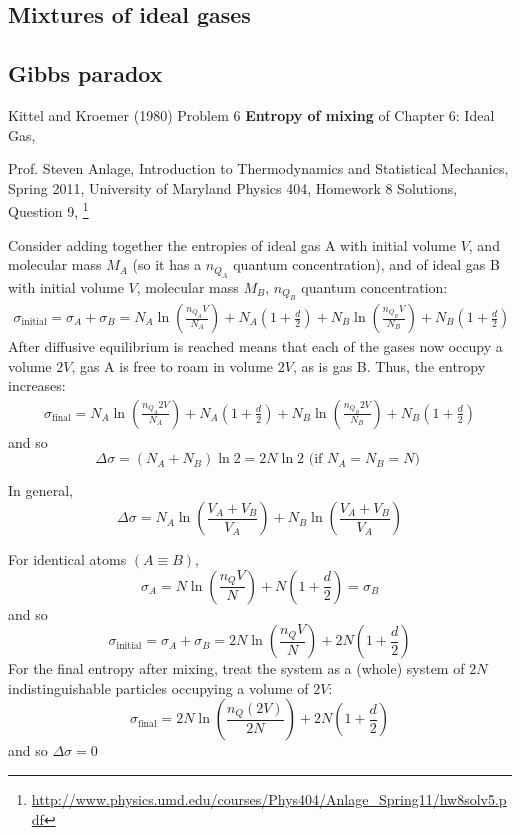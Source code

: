 \documentclass[10pt]{amsart}
\begin{document}
\begin{multicols*}{2}
\section{Mixtures of ideal gases}

\subsection{Gibbs paradox}


Kittel and Kroemer (1980) \cite{CKittelHKroemer1980} Problem 6 \textbf{Entropy of mixing} of Chapter 6: Ideal Gas,

Prof. Steven Anlage, Introduction to Thermodynamics and Statistical Mechanics, Spring 2011, University of Maryland Physics 404, Homework 8 Solutions, Question 9, \footnote{\url{http://www.physics.umd.edu/courses/Phys404/Anlage_Spring11/hw8solv5.pdf}}

Consider adding together the entropies of ideal gas A with initial volume $V$, and molecular mass $M_A$ (so it has a $n_{Q_A}$ quantum concentration), and of ideal gas B with initial volume $V$, molecular mass $M_B$, $n_{Q_B}$ quantum concentration:
\[
\begin{gathered}
  \sigma_{\text{initial}} = \sigma_A + \sigma_B = N_A \ln{ \left( \frac{n_{Q_A} V}{N_A} \right) } + N_A \left( 1 + \frac{d}{2} \right)  + N_B \ln{ \left( \frac{n_{Q_B} V}{N_B} \right) } + N_B \left( 1 + \frac{d}{2} \right) 
\end{gathered}
\]
After diffusive equilibrium is reached means that each of the gases now occupy a volume $2V$, gas A is free to roam in volume $2V$, as is gas B.  Thus, the entropy increases:
\[
\begin{gathered}
  \sigma_{\text{final}} = N_A \ln{ \left( \frac{n_{Q_A} 2V}{N_A} \right) } + N_A \left( 1 + \frac{d}{2} \right)  + N_B \ln{ \left( \frac{n_{Q_B} 2V}{N_B} \right) } + N_B \left( 1 + \frac{d}{2} \right) 
\end{gathered}
\]
and so
\[
\Delta \sigma = (N_A + N_B)\ln{2} = 2N\ln{2} \text{ (if $N_A=N_B=N$) }
\]

In general,
\[
\Delta \sigma = N_A \ln{ \left( \frac{V_A + V_B}{V_A} \right) } + N_B \ln{ \left( \frac{V_A + V_B}{V_A} \right) }
\]


For identical atoms $(A\equiv B)$, 
\[
\sigma_A = N \ln{ \left( \frac{ n_Q V}{N} \right) } + N \left( 1 + \frac{d}{2} \right) = \sigma_B
\]
and so
\[
\sigma_{\text{initial}} = \sigma_A + \sigma_B = 2N \ln{ \left( \frac{n_Q V}{N} \right) } + 2N\left( 1 + \frac{d}{2} \right) 
\]
For the final entropy after mixing, treat the system as a (whole) system of $2N$ indistinguishable particles occupying a volume of $2V$:
\[
\sigma_{\text{final}} = 2N \ln{ \left( \frac{n_Q(2V)}{2N} \right) } + 2N \left( 1 + \frac{d}{2} \right)
\]
and so $\Delta \sigma =0$



\end{multicols*}
\end{document}
